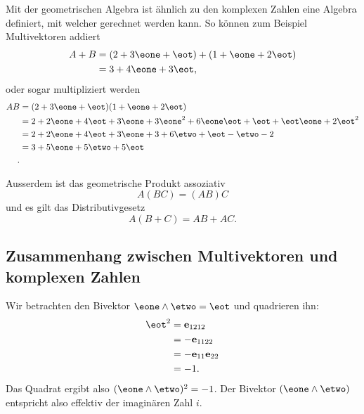 Mit der geometrischen Algebra ist ähnlich zu den komplexen Zahlen eine Algebra definiert,
mit welcher gerechnet werden kann. So können zum Beispiel Multivektoren addiert
\begin{equation}
\begin{aligned}
A + B &= (2 + 3 \eone + \eot) + (1 + \eone + 2 \eot) \\
&= 3 + 4 \eone + 3 \eot,
\end{aligned}
\end{equation}
oder sogar multipliziert werden
\begin{equation}
\begin{aligned}
A  B &= (2 + 3 \eone + \eot) (1 + \eone + 2 \eot) \\
&= 2 + 2 \eone + 4 \eot + 3 \eone + 3 \eone^2 + 6 \eone \eot + \eot + \eot \eone + 2 \eot^2 \\
&= 2 + 2 \eone + 4 \eot + 3 \eone + 3 + 6 \etwo + \eot - \etwo - 2 \\
&= 3 + 5 \eone + 5 \etwo + 5 \eot \\.
\end{aligned}
\end{equation}

Ausserdem ist das geometrische Produkt assoziativ
\begin{equation}
A (B C) = (A B) C
\end{equation}
und es gilt das Distributivgesetz
\begin{equation}
  A (B + C) = AB + AC.
\end{equation}


\newcommand\equalhat{\mathrel{\stackon[1.5pt]{=}{\stretchto{%
    \scalerel*[\widthof{=}]{\wedge}{\rule{1ex}{3ex}}}{0.5ex}}}}

\subsection{Zusammenhang zwischen Multivektoren und komplexen Zahlen}
Wir betrachten den Bivektor $\eone \wedge \etwo = \eot$ und quadrieren ihn:
\begin{equation}
  \begin{aligned}
    \eot^2 &= \mathbf{e}_{1212} \\
    &= -\mathbf{e}_{1122} \\
    &= -\mathbf{e}_{11} \mathbf{e}_{22} \\
    &= -1.
  \end{aligned}
\end{equation}
Das Quadrat ergibt also $(\eone \wedge \etwo)^2 = -1$. Der Bivektor
$(\eone \wedge \etwo)$ entspricht also effektiv der imaginären Zahl $i$.


